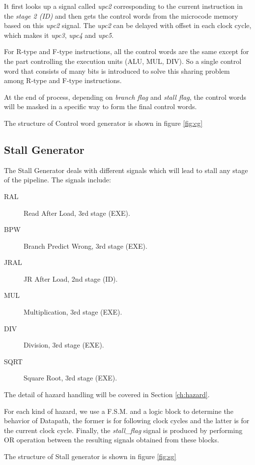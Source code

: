 It first looks up a signal called {\it upc2} corresponding to the current instruction in the {\it stage 2 (ID)} and then gets the control
words from the microcode memory based on this {\it upc2} signal. The {\it upc2} can be delayed with offset in each clock cycle,
which makes it {\it upc3}, {\it upc4} and {\it upc5}.

For R-type and F-type instructions, all the control words are the same
except for the part controlling the execution units (ALU, MUL, DIV).
So a single control word that consists of many bits is introduced to solve this sharing problem among R-type
and F-type instructions.

At the end of process, depending on {\it branch flag} and {\it stall flag}, the control words will be masked in
a specific way to form the final control words.

The structure of Control word generator is shown in figure \ref{fig:cg}

\subsection[Stall Generator]{Stall Generator}
The Stall Generator deals with different signals which will lead to stall any stage
of the pipeline. The signals include:

\begin{description}
  \item[RAL] Read After Load, 3rd stage (EXE).
  \item[BPW] Branch Predict Wrong, 3rd stage (EXE).
  \item[JRAL] JR After Load, 2nd stage (ID).
  \item[MUL] Multiplication, 3rd stage (EXE).
  \item[DIV] Division, 3rd stage (EXE).
  \item[SQRT] Square Root, 3rd stage (EXE).
\end{description}

The detail of hazard handling will be covered in Section \ref{ch:hazard}.

For each kind of hazard, we use a F.S.M. and a logic block to determine the behavior of
Datapath, the former is for following clock cycles and the latter is for the current clock
cycle. Finally, the {\it stall\_flag} signal is produced by performing OR operation between
the resulting signals obtained from these blocks.

The structure of Stall generator is shown in figure \ref{fig:sg}

